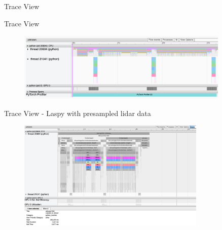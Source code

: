 \documentclass[compress,aspectratio=169]{beamer}
\begin{document}
\begin{frame}
\begin{center}
Trace View
\end{center}
\end{frame}

\begin{frame}{Trace View}
    \vspace{-1em}
\begin{center}
    \begin{figure}
        \includegraphics[width=0.9\textwidth]{../../data/scap_gtx1080_profiler-torch_batch-size-64_14650758_trace-view}
    \end{figure}
    \end{center}
\end{frame}

\begin{frame}{Trace View - Laspy with presampled lidar data}
    \vspace{-1em}
\begin{center}
    \begin{figure}
        \includegraphics[width=0.8\textwidth]{../../data/scap_gtx1080_profiler-torch_batch-size-64_14650758_trace-view-laspy}
    \end{figure}
    \end{center}
\end{frame}
\end{document}
